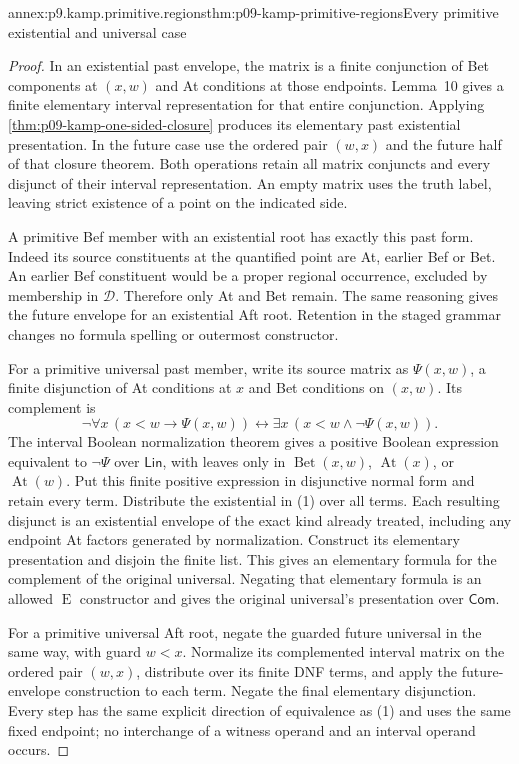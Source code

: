\begin{annexitem}{annex:p9.kamp.primitive.regions}{thm:p09-kamp-primitive-regions}{Every primitive existential and universal case}
\begin{proof}
In an existential past envelope, the matrix is a finite conjunction
of Bet components at \((x,w)\) and At conditions at those
endpoints. Lemma~10 gives a finite elementary interval representation
for that entire conjunction. Applying
\cref{thm:p09-kamp-one-sided-closure} produces its elementary
past existential presentation. In the future case use the ordered
pair \((w,x)\) and the future half of that closure theorem.
Both operations retain all matrix conjuncts and every disjunct of
their interval representation. An empty matrix uses the truth
label, leaving strict existence of a point on the indicated side.

A primitive Bef member with an existential root has exactly this
past form. Indeed its source constituents at the quantified point
are At, earlier Bef or Bet. An earlier Bef constituent would be
a proper regional occurrence, excluded by membership in
\(\mathcal D\). Therefore only At and Bet remain. The
same reasoning gives the future envelope for an existential Aft
root. Retention in the staged grammar changes no formula spelling
or outermost constructor.

For a primitive universal past member, write its source matrix as
\(\Psi(x,w)\), a finite disjunction of At conditions at
\(x\) and Bet conditions on \((x,w)\). Its complement is
\[
 \neg\forall x\,(x<w\to\Psi(x,w))
          \longleftrightarrow\exists x\,(x<w\land\neg\Psi(x,w)).
 \tag{1}
\]
The interval Boolean normalization theorem gives a positive Boolean
expression equivalent to \(\neg\Psi\) over \(\mathsf{Lin}\),
with leaves only in \(\operatorname{Bet}(x,w)\),
\(\operatorname{At}(x)\), or \(\operatorname{At}(w)\).
Put this finite positive expression in disjunctive normal form and
retain every term. Distribute the existential in (1) over all terms.
Each resulting disjunct is an existential envelope of the exact
kind already treated, including any endpoint At factors generated
by normalization. Construct its elementary presentation and disjoin
the finite list. This gives an elementary formula for the complement
of the original universal. Negating that elementary formula is an
allowed \(\operatorname{E}\) constructor and gives the original
universal's presentation over \(\mathsf{Com}\).

For a primitive universal Aft root, negate the guarded future
universal in the same way, with guard \(w<x\). Normalize
its complemented interval matrix on the ordered pair \((w,x)\),
distribute over its finite DNF terms, and apply the future-envelope
construction to each term. Negate the final elementary disjunction.
Every step has the same explicit direction of equivalence as (1)
and uses the same fixed endpoint; no interchange of a witness
operand and an interval operand occurs.


\end{proof}
\end{annexitem}

